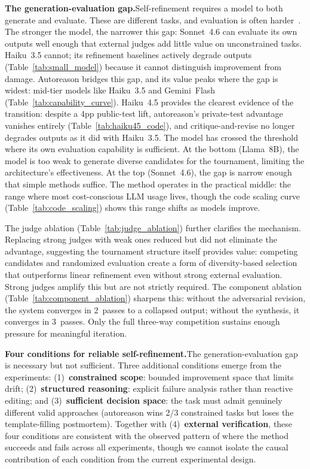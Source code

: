 \documentclass[11pt]{article}
\begin{document}
\textbf{The generation-evaluation gap.}\enspace Self-refinement requires a model to both generate and evaluate. These are different tasks, and evaluation is often harder~\cite{huang2023}. The stronger the model, the narrower this gap: Sonnet~4.6 can evaluate its own outputs well enough that external judges add little value on unconstrained tasks. Haiku~3.5 cannot; its refinement baselines actively degrade outputs (Table~\ref{tab:small_model}) because it cannot distinguish improvement from damage. Autoreason bridges this gap, and its value peaks where the gap is widest: mid-tier models like Haiku~3.5 and Gemini~Flash (Table~\ref{tab:capability_curve}). Haiku~4.5 provides the clearest evidence of the transition: despite a 4pp public-test lift, autoreason's private-test advantage vanishes entirely (Table~\ref{tab:haiku45_code}), and critique-and-revise no longer degrades outputs as it did with Haiku~3.5. The model has crossed the threshold where its own evaluation capability is sufficient. At the bottom (Llama~8B), the model is too weak to generate diverse candidates for the tournament, limiting the architecture's effectiveness. At the top (Sonnet~4.6), the gap is narrow enough that simple methods suffice. The method operates in the practical middle: the range where most cost-conscious LLM usage lives, though the code scaling curve (Table~\ref{tab:code_scaling}) shows this range shifts as models improve.

The judge ablation (Table~\ref{tab:judge_ablation}) further clarifies the mechanism. Replacing strong judges with weak ones reduced but did not eliminate the advantage, suggesting the tournament structure itself provides value: competing candidates and randomized evaluation create a form of diversity-based selection that outperforms linear refinement even without strong external evaluation. Strong judges amplify this but are not strictly required. The component ablation (Table~\ref{tab:component_ablation}) sharpens this: without the adversarial revision, the system converges in 2~passes to a collapsed output; without the synthesis, it converges in 3~passes. Only the full three-way competition sustains enough pressure for meaningful iteration.

\textbf{Four conditions for reliable self-refinement.}\enspace The generation-evaluation gap is necessary but not sufficient. Three additional conditions emerge from the experiments: (1)~\textbf{constrained scope}: bounded improvement space that limits drift; (2)~\textbf{structured reasoning}: explicit failure analysis rather than reactive editing; and (3)~\textbf{sufficient decision space}: the task must admit genuinely different valid approaches (autoreason wins 2/3 constrained tasks but loses the template-filling postmortem). Together with (4)~\textbf{external verification}, these four conditions are consistent with the observed pattern of where the method succeeds and fails across all experiments, though we cannot isolate the causal contribution of each condition from the current experimental design.
\end{document}
